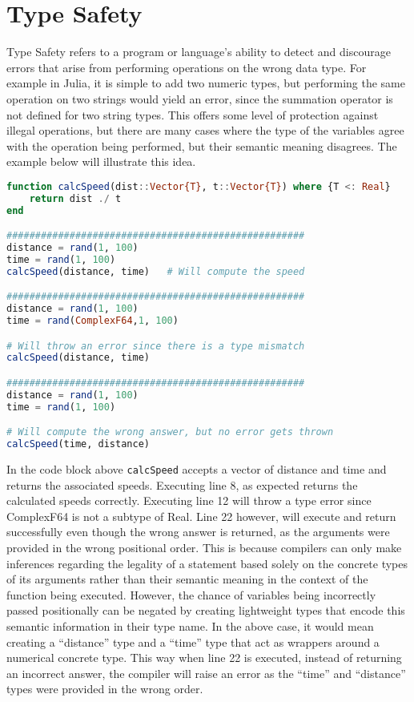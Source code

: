 \section{Type Safety}
Type Safety refers to a program or language's ability to detect and discourage errors that arise from performing
operations on the wrong data type. For example in Julia, it is simple to add two numeric types, but performing the same
operation on two strings would yield an error, since the summation operator is not defined for two string types. This
offers some level of protection against illegal operations, but there are many cases where the type of the variables
agree with the operation being performed, but their semantic meaning disagrees. The example below will illustrate this
idea.
\begin{lstlisting}[language=Julia]
function calcSpeed(dist::Vector{T}, t::Vector{T}) where {T <: Real}
    return dist ./ t
end

#################################################### 
distance = rand(1, 100)
time = rand(1, 100)
calcSpeed(distance, time)   # Will compute the speed

#################################################### 
distance = rand(1, 100)
time = rand(ComplexF64,1, 100)

# Will throw an error since there is a type mismatch
calcSpeed(distance, time)  

#################################################### 
distance = rand(1, 100)
time = rand(1, 100)

# Will compute the wrong answer, but no error gets thrown
calcSpeed(time, distance) 
\end{lstlisting}
In the code block above \lstinline[language=Julia]{calcSpeed} accepts a vector of distance and time and returns the
associated speeds. Executing line 8, as expected returns the calculated speeds correctly. Executing line 12 will throw a
type error since ComplexF64 is not a subtype of Real. Line 22 however, will execute and return successfully even though
the wrong answer is returned, as the arguments were provided in the wrong positional order. This is because compilers
can only make inferences regarding the legality of a statement based solely on the concrete types of its arguments
rather than their semantic meaning in the context of the function being executed. However, the chance of variables being
incorrectly passed positionally can be negated by creating lightweight types that encode this semantic information in
their type name. In the above case, it would mean creating a ``distance'' type and a ``time'' type that act as wrappers
around a numerical concrete type. This way when line 22 is executed, instead of returning an incorrect answer, the
compiler will raise an error as the ``time'' and ``distance'' types were provided in the wrong order.


